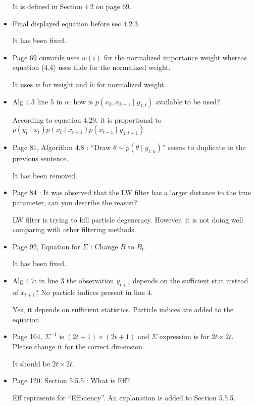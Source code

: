 \documentclass[a4paper,18pt]{extarticle}
\begin{document}
\begin{itemize}
	It is defined in Section 4.2 on page 69. 	
	
	\item  Final displayed equation before sec 4.2.3.
	
	It has been fixed. 	
	
	\item Page 69 onwards uses $w(i)$ for the normalized importance weight whereas equation 
(4.4) uses tilde for the normalized weight.
	
	It uses $w$ for weight and $\tilde{w}$ for normalized weight.
	
	\item Alg 4.3 line 5 in $\alpha$: how is $p(x_k, x_{k−1}\mid y_{1:t})$ available to be used?
	
	According to equation 4.29, it is proportional to $p(y_t\mid x_t)p(x_t\mid x_{t-1})p(x_{t-1}\mid y_{1:t-1})$
	
	
 	\item Page 81, Algorithm 4.8 : ``Draw $\theta \sim p(\theta\mid y_{1:k})$'' seems to duplicate to the previous sentence. 

 	It has been removed.
 	
	\item Page 84 : It was observed that the LW filter has a larger distance to the true parameter, can you describe the reason?
	
	LW filter is trying to kill particle degeneracy. However, it is not doing well comparing with other filtering methods. 
	
 	\item Page 92, Equation for $\Sigma$ : Change $B$ to $B_t$. 
 	
 	It has been fixed. 
	
	\item Alg 4.7: in line 3 the observation $y_{t+1}$ depends on the sufficient stat instead of $x_{t+1}$? No particle indices present in line 4.
	
	Yes, it depends on sufficient statistics. Particle indices are added to the equation.
	
	\item Page 104, $\Sigma^{-1}$ is $(2t+1)\times(2t+1)$ and $\Sigma$ expression is for $2t\times2t$. Please change it for the correct dimension.
	
	It should be $2t\times2t$.
	
	\item Page 120. Section 5.5.5 : What is Eff?
	
	Eff represents for ``Efficiency''. An explanation is added to Section 5.5.5.
 	

\end{itemize}
\end{document}
